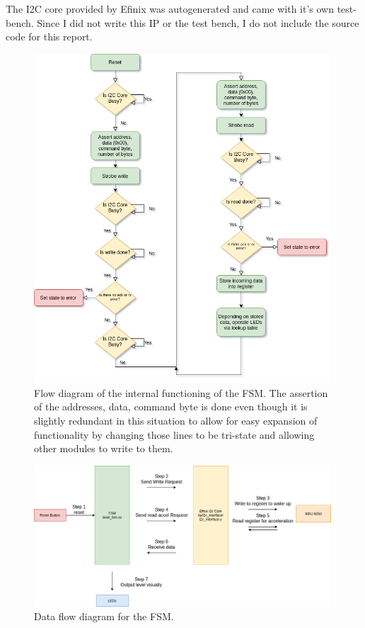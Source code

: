 \documentclass[11pt]{article}
\begin{document}
The I2C core provided by Efinix was autogenerated and came with it's own test-bench. Since I did not write this IP or the test bench, I do not include the source code for this report.


\begin{figure}[H]
    \centering
\includegraphics[width=0.99\textwidth]{flow.png}
    \caption{Flow diagram of the internal functioning of the FSM. The assertion of the addresses, data, command byte is done even though it is slightly redundant in this situation to allow for easy expansion of functionality by changing those lines to be tri-state and allowing other modules to write to them.}
    \label{fig:foobar}
\end{figure}

\begin{figure}[H]
    \centering
\includegraphics[width=0.99\textwidth]{data_flow.png}
    \caption{Data flow diagram for the FSM.}
    \label{fig:foobar}
\end{figure}
\end{document}
